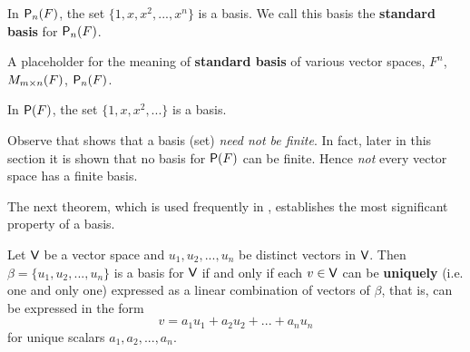 \begin{example} \label{example 1.6.4}
In \(\textsf{P}_n(F)\), the set \(\{ 1, x, x^2, ..., x^n \}\) is a basis.
We call this basis the \textbf{standard basis} for \(\textsf{P}_n(F)\).
\end{example}

\begin{additional definition} \label{adef 1.11}
A placeholder for the meaning of \textbf{standard basis} of various vector spaces, \(F^n\), \(M_{m \times n}(F)\), \(\textsf{P}_n(F)\).
\end{additional definition}

\begin{example} \label{example 1.6.5}
In \(\textsf{P}(F)\), the set \(\{1, x, x^2, ... \}\) is a basis.
\end{example}

\begin{remark} \label{remark 1.6.1}
Observe that  shows that a basis (set) \emph{need not be finite}.
In fact, later in this section it is shown that no basis for \(\textsf{P}(F)\) can be finite.
Hence \emph{not} every vector space has a finite basis.
\end{remark}

The next theorem, which is used frequently in , establishes the most significant property of a basis.

\begin{theorem} \label{thm 1.8}
Let \(\textsf{V}\) be a vector space and \(u_1, u_2, ..., u_n\) be distinct vectors in \(\textsf{V}\).
Then \(\beta = \{ u_1, u_2, ..., u_n \}\) is a basis for \(\textsf{V}\) if and only if each \(v \in \textsf{V}\) can be \textbf{uniquely} (i.e. one and only one) expressed as a linear combination of vectors of \(\beta\), that is, can be expressed in the form
\[
    v = a_1 u_1 + a_2 u_2 + ... + a_n u_n
\]
for unique scalars \(a_1, a_2, ..., a_n\).
\end{theorem}

